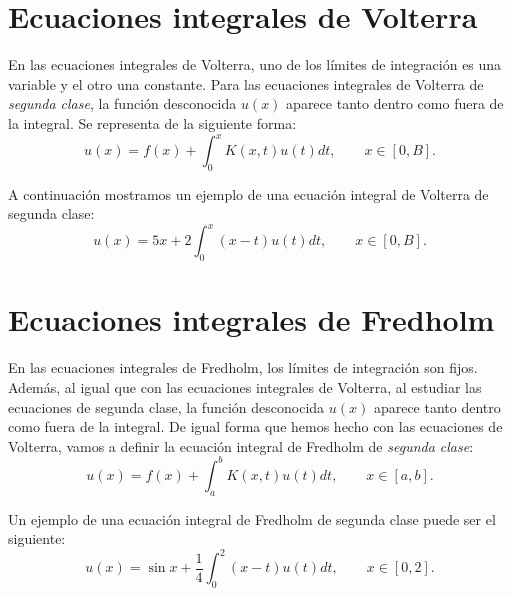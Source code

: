 \section{Ecuaciones integrales de Volterra}
En las ecuaciones integrales de Volterra, uno de los límites de integración es una variable y el otro una constante. Para las ecuaciones integrales de Volterra de \textit{segunda clase}, la función desconocida $u(x)$ aparece tanto dentro como fuera de la integral. Se representa de la siguiente forma:
\begin{equation}\label{eq:volterra}
	u(x) = f(x) + \int_0^x K(x,t)u(t)dt, \qquad x \in [0,B].
\end{equation}
\begin{ejemplo}
	A continuación mostramos un ejemplo de una ecuación integral de Volterra de segunda clase:
	\begin{equation}\label{}
		u(x) = 5x + 2\int_0^x (x-t)u(t)dt, \qquad x \in [0,B].
	\end{equation}	
\end{ejemplo}

\section{Ecuaciones integrales de Fredholm}
En las ecuaciones integrales de Fredholm, los límites de integración son fijos. Además, al igual que con las ecuaciones integrales de Volterra, al estudiar las ecuaciones de segunda clase, la función desconocida $u(x)$ aparece tanto dentro como fuera de la integral. De igual forma que hemos hecho con las ecuaciones de Volterra, vamos a definir la ecuación integral de Fredholm de \textit{segunda clase}:
\begin{equation}\label{}
	u(x) = f(x) + \int_a^b K(x,t)u(t)dt, \qquad x \in [a,b].
\end{equation}
\begin{ejemplo}
	Un ejemplo de una ecuación integral de Fredholm de segunda clase puede ser el siguiente:
	\begin{equation}\label{}
		u(x) = \sin x + \dfrac{1}{4}\int_{0}^2 (x-t)u(t)dt, \qquad x \in [0,2].
	\end{equation}
\end{ejemplo}
